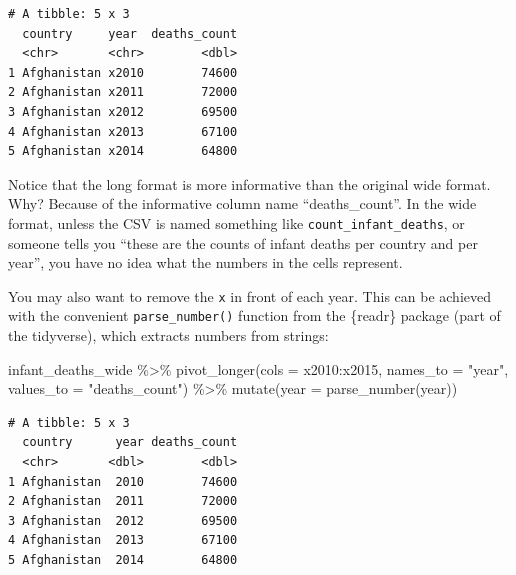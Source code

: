 \documentclass[
  letterpaper,
  DIV=11,
  numbers=noendperiod]{scrreprt}
\newenvironment{Shaded}{\begin{snugshade}}{\end{snugshade}}
\newcommand{\AttributeTok}[1]{\textcolor[rgb]{0.40,0.45,0.13}{#1}}
\newcommand{\FunctionTok}[1]{\textcolor[rgb]{0.28,0.35,0.67}{#1}}
\newcommand{\NormalTok}[1]{\textcolor[rgb]{0.00,0.23,0.31}{#1}}
\newcommand{\SpecialCharTok}[1]{\textcolor[rgb]{0.37,0.37,0.37}{#1}}
\newcommand{\StringTok}[1]{\textcolor[rgb]{0.13,0.47,0.30}{#1}}
\begin{document}
\begin{verbatim}
# A tibble: 5 x 3
  country     year  deaths_count
  <chr>       <chr>        <dbl>
1 Afghanistan x2010        74600
2 Afghanistan x2011        72000
3 Afghanistan x2012        69500
4 Afghanistan x2013        67100
5 Afghanistan x2014        64800
\end{verbatim}

\begin{tcolorbox}[enhanced jigsaw, titlerule=0mm, colback=white, left=2mm, breakable, opacitybacktitle=0.6, colbacktitle=quarto-callout-note-color!10!white, colframe=quarto-callout-note-color-frame, bottomtitle=1mm, opacityback=0, coltitle=black, arc=.35mm, toptitle=1mm, title=\textcolor{quarto-callout-note-color}{\faInfo}\hspace{0.5em}{Side Note}, leftrule=.75mm, toprule=.15mm, bottomrule=.15mm, rightrule=.15mm]

Notice that the long format is more informative than the original wide
format. Why? Because of the informative column name ``deaths\_count''.
In the wide format, unless the CSV is named something like
\texttt{count\_infant\_deaths}, or someone tells you ``these are the
counts of infant deaths per country and per year'', you have no idea
what the numbers in the cells represent.

\end{tcolorbox}

You may also want to remove the \texttt{x} in front of each year. This
can be achieved with the convenient \texttt{parse\_number()} function
from the \{readr\} package (part of the tidyverse), which extracts
numbers from strings:

\begin{Shaded}
\begin{Highlighting}[]
\NormalTok{infant\_deaths\_wide }\SpecialCharTok{\%\textgreater{}\%} 
  \FunctionTok{pivot\_longer}\NormalTok{(}\AttributeTok{cols =}\NormalTok{ x2010}\SpecialCharTok{:}\NormalTok{x2015,}
               \AttributeTok{names\_to =} \StringTok{"year"}\NormalTok{, }
               \AttributeTok{values\_to =} \StringTok{"deaths\_count"}\NormalTok{) }\SpecialCharTok{\%\textgreater{}\%} 
  \FunctionTok{mutate}\NormalTok{(}\AttributeTok{year =} \FunctionTok{parse\_number}\NormalTok{(year))}
\end{Highlighting}
\end{Shaded}

\begin{verbatim}
# A tibble: 5 x 3
  country      year deaths_count
  <chr>       <dbl>        <dbl>
1 Afghanistan  2010        74600
2 Afghanistan  2011        72000
3 Afghanistan  2012        69500
4 Afghanistan  2013        67100
5 Afghanistan  2014        64800
\end{verbatim}
\end{document}
